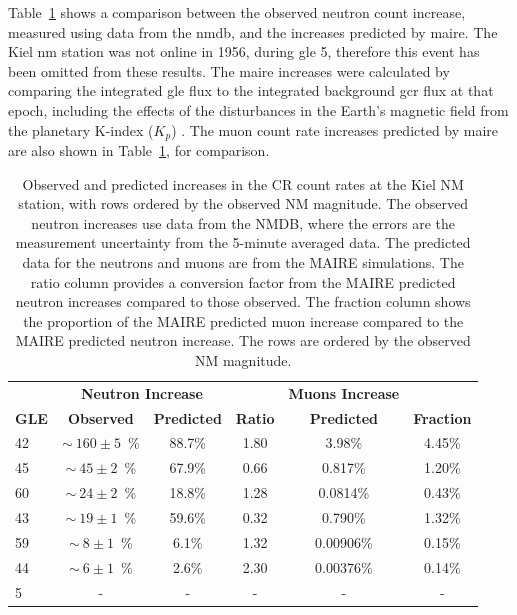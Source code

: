 Table~\ref{tab:KIEL_GLEs} shows a comparison between the observed neutron count increase, measured using data from the \gls{nmdb}, and the increases predicted by \gls{maire}. The Kiel \gls{nm} station was not online in 1956, during \gls{gle} 5, therefore this event has been omitted from these results. The \gls{maire} increases were calculated by comparing the integrated \gls{gle} flux to the integrated background \gls{gcr} flux at that epoch, including the effects of the disturbances in the Earth's magnetic field from the planetary K-index ($K_p$) \citep{bartels_three-hour-range_1939}. The muon count rate increases predicted by \gls{maire} are also shown in Table~\ref{tab:KIEL_GLEs}, for comparison.

\vspace{1em}

\begin{table}[ht!]
	\begin{center}
		\caption{Observed and predicted increases in the CR count rates at the Kiel NM station, with rows ordered by the observed NM magnitude. The observed neutron increases use data from the NMDB, where the errors are the measurement uncertainty from the 5-minute averaged data. The predicted data for the neutrons and muons are from the MAIRE simulations. The ratio column provides a conversion factor from the MAIRE predicted neutron increases compared to those observed. The fraction column shows the proportion of the MAIRE predicted muon increase compared to the MAIRE predicted neutron increase. The rows are ordered by the observed NM magnitude.}
		\label{tab:KIEL_GLEs}
		\begin{tabular}{l c c c | c c}
			\hline
			&  \multicolumn{2}{c}{\bf Neutron Increase} & & {\bf Muons Increase} & \\
			{\bf GLE} & {\bf Observed} & {\bf Predicted} & {\bf Ratio} & {\bf Predicted} & {\bf Fraction}\\ 
			\hline
			42 & $\sim~160\pm5$~\% & 88.7\% & 1.80 & 3.98\% & 4.45\% \\
			45  & $\sim~45\pm2$~\% & 67.9\% & 0.66 & 0.817\% & 1.20\% \\
			60 & $\sim~24\pm2$~\% & 18.8\% & 1.28 & 0.0814\% & 0.43\% \\
			43 & $\sim~19\pm1$~\% & 59.6\% & 0.32 & 0.790\% & 1.32\% \\
			59 & $\sim~8\pm1$~\% & 6.1\% & 1.32 & 0.00906\% & 0.15\% \\
			44  & $\sim~6\pm1$~\% & 2.6\% & 2.30 & 0.00376\% & 0.14\% \\
			5 & - & - & - & - & - \\
			\hline
		\end{tabular}
	\end{center}
\end{table}

